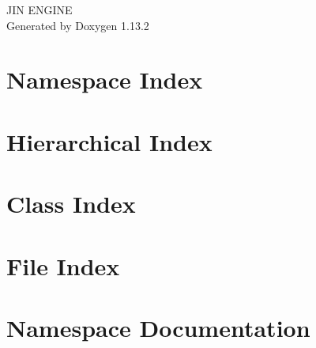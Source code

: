 \documentclass[twoside]{book}
\newcommand{\+}{\discretionary{\mbox{\scriptsize$\hookleftarrow$}}{}{}}
\newcommand{\clearemptydoublepage}{%
    \newpage{\pagestyle{empty}\cleardoublepage}%
  }
\begin{document}
  \raggedbottom
    \hypersetup{pageanchor=false,
                bookmarksnumbered=true,
                pdfencoding=unicode
               }
  \begin{titlepage}
  \vspace*{7cm}
  \begin{center}%
  {\Large JIN ENGINE}\\
  \vspace*{1cm}
  {\large Generated by Doxygen 1.13.2}\\
  \end{center}
  \end{titlepage}
  \clearemptydoublepage
  \tableofcontents
  \clearemptydoublepage
  \hypersetup{pageanchor=true}
\chapter{Namespace Index}

\chapter{Hierarchical Index}

\chapter{Class Index}

\chapter{File Index}

\chapter{Namespace Documentation}

\end{document}
